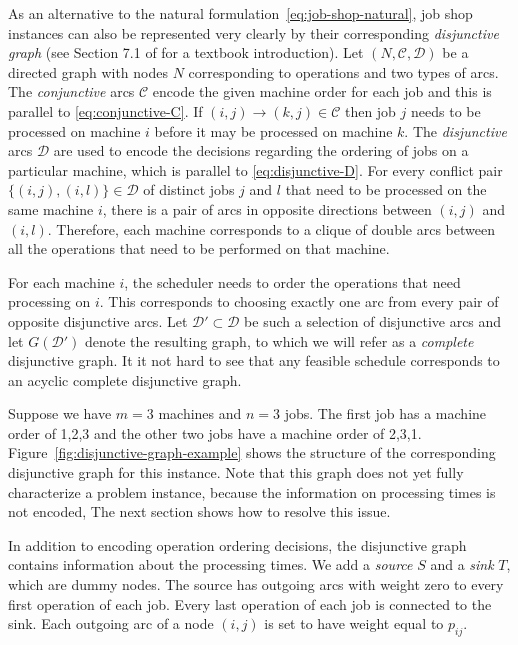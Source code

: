 \documentclass{article}
\theoremstyle{definition}
\theoremstyle{plain}
\begin{document}
As an alternative to the natural formulation~\eqref{eq:job-shop-natural}, job
shop instances can also be represented very clearly by their corresponding
\textit{disjunctive graph} (see Section 7.1 of
\cite{pinedoSchedulingTheoryAlgorithms2016} for a textbook introduction). Let
$(N, \mathcal{C}, \mathcal{D})$ be a directed graph with nodes $N$ corresponding
to operations and two types of arcs. The \textit{conjunctive} arcs $\mathcal{C}$
encode the given machine order for each job and this is parallel to
\eqref{eq:conjunctive-C}. If $(i,j) \rightarrow (k, j) \in \mathcal{C}$ then job
$j$ needs to be processed on machine $i$ before it may be processed on machine
$k$. The \textit{disjunctive} arcs $\mathcal{D}$ are used to encode the
decisions regarding the ordering of jobs on a particular machine, which is
parallel to \eqref{eq:disjunctive-D}. For every conflict pair
$\{(i,j), (i,l)\} \in \mathcal{D}$ of distinct jobs $j$ and $l$ that need to be
processed on the same machine $i$, there is a pair of arcs in opposite
directions between $(i,j)$ and $(i,l)$. Therefore, each machine corresponds to a
clique of double arcs between all the operations that need to be performed on
that machine.

For each machine $i$, the scheduler needs to order the operations that need
processing on $i$. This corresponds to choosing exactly one arc from every pair
of opposite disjunctive arcs. Let $\mathcal{D}' \subset \mathcal{D}$ be such a
selection of disjunctive arcs and let $G(\mathcal{D}')$ denote the resulting
graph, to which we will refer as a \textit{complete} disjunctive graph. It it
not hard to see that any feasible schedule corresponds to an acyclic complete
disjunctive graph.

Suppose we have $m=3$ machines and $n=3$ jobs. The first job has a machine order
of 1,2,3 and the other two jobs have a machine order of 2,3,1.
Figure~\ref{fig:disjunctive-graph-example} shows the structure of the
corresponding disjunctive graph for this instance. Note that this graph does not
yet fully characterize a problem instance, because the information on processing
times is not encoded, The next section shows how to resolve this issue.

In addition to encoding operation ordering decisions, the disjunctive graph
contains information about the processing times. We add a \textit{source} $S$
and a \textit{sink} $T$, which are dummy nodes. The source has outgoing arcs
with weight zero to every first operation of each job. Every last operation of
each job is connected to the sink. Each outgoing arc of a node $(i,j)$ is set to
have weight equal to $p_{ij}$.
\end{document}
